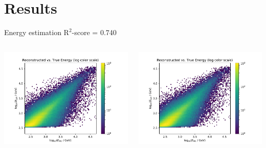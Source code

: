 \section{Results}
\begin{frame}[t]{Energy estimation $\mathrm{R}^2$-score = 0.740}
\begin{columns}[onlytextwidth]
    \begin{column}{0.475\textwidth}
        \includegraphics[width=1.15\textwidth,page=1]{fig/energy_performance.pdf}
    \end{column}
    \begin{column}{0.475\textwidth}
        \includegraphics[width=1.15\textwidth,page=3]{fig/energy_performance.pdf}
    \end{column}
\end{columns}
\end{frame}

